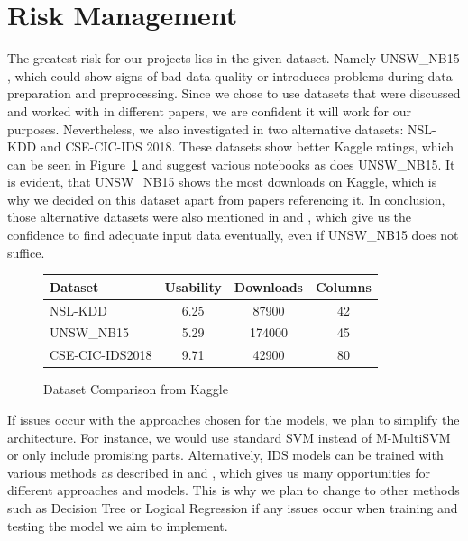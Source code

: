 \section{Risk Management}
The greatest risk for our projects lies in the given dataset. Namely UNSW\_NB15 \cite{UNSW}, which could show signs of bad data-quality or introduces problems during data preparation and preprocessing. Since we chose to use datasets that were discussed and worked with in different papers, we are confident it will work for our purposes. Nevertheless, we also investigated in two alternative datasets: NSL-KDD \cite{NSL} and CSE-CIC-IDS 2018\cite{CSE}. These datasets show better Kaggle ratings, which can be seen in Figure~\ref{fig:kaggle} and suggest various notebooks as does UNSW\_NB15. It is evident, that UNSW\_NB15 shows the most downloads on Kaggle, which is why we decided on this dataset apart from papers referencing it. In conclusion, those alternative datasets were also mentioned in \cite{SVM} and \cite{wu2022intrusion}, which give us the confidence to find adequate input data eventually, even if UNSW\_NB15 does not suffice. 


\nextparagraph
\begin{figure}[htbp]
    \centering
    \begin{tabular}{lccc}
        \toprule
        \textbf{Dataset} & \textbf{Usability} & \textbf{Downloads} & \textbf{Columns} \\
        \midrule
        NSL-KDD & 6.25& 87900 & 42 \\
        UNSW\_NB15 & 5.29 & 174000 & 45 \\
        CSE-CIC-IDS2018 & 9.71 & 42900 & 80 \\
        \bottomrule
    \end{tabular}
    \caption{Dataset Comparison from Kaggle}
    \label{fig:kaggle}
\end{figure}


\nextparagraph
If issues occur with the approaches chosen for the models, we plan to simplify the architecture. For instance, we would use standard SVM instead of M-MultiSVM or only include promising parts. Alternatively, IDS models can be trained with various methods as described in \cite{abdulganiyu2023systematic} and \cite{saranya2020performance}, which gives us many opportunities for different approaches and models. This is why we plan to change to other methods such as Decision Tree or Logical Regression if any issues occur when training and testing the model we aim to implement.